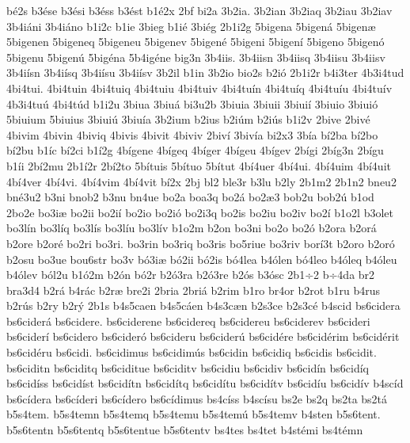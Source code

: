 {b^^e92s
b3^^e9se
b3^^e9si
b3^^e9ss
b3^^e9st
b1^^e92x
2bf
bi2a
3b2ia.
3b2ian
3b2iaq
3b2iau
3b2iav
3b4i^^e1ni
3b4i^^e1no
b1i2c
b1ie
3bieg
b1i^^e9
3bi^^e9g
2b1i2g
5bigena
5bigen^^e1
5bigen^^e6
5bigenen
5bigeneq
5bigeneu
5bigenev
5bigen^^e9
5bigeni
5bigen^^ed
5bigeno
5bigen^^f3
5bigenu
5bigen^^fa
5big^^e9na
5b4ig^^e9ne
big3n
3b4iis.
3b4iisn
3b4iisq
3b4iisu
3b4iisv
3b4i^^edsn
3b4i^^edsq
3b4i^^edsu
3b4i^^edsv
3b2il
b1in
3b2io
bio2s
b2i^^f3
2b1i2r
b4i3ter
4b3i4tud
4bi4tui.
4bi4tuin
4bi4tuiq
4bi4tuiu
4bi4tuiv
4bi4tu^^edn
4bi4tu^^edq
4bi4tu^^edu
4bi4tu^^edv
4b3i4tu^^fa
4bi4t^^fad
b1i2u
3biua
3biu^^e1
bi3u2b
3biuia
3biuii
3biui^^ed
3biuio
3biui^^f3
5biuium
5biuius
3biui^^fa
3biu^^eda
3b2ium
b2ius
b2i^^fam
b2i^^fas
b1i2v
2bive
2biv^^e9
4bivim
4bivin
4biviq
4bivis
4bivit
4biviv
2biv^^ed
3biv^^eda
bi2x3
3b^^eda
b^^ed2ba
b^^ed2bo
b^^ed2bu
b1^^edc
b^^ed2ci
b1^^ed2g
4b^^edgene
4b^^edgeq
4b^^edger
4b^^edgeu
4b^^edgev
2b^^edgi
2b^^edg3n
2b^^edgu
b1^^edi
2b^^ed2mu
2b1^^ed2r
2b^^ed2to
5b^^edtuis
5b^^edtuo
5b^^edtut
4b^^ed4uer
4b^^ed4ui.
4b^^ed4uim
4b^^ed4uit
4b^^ed4ver
4b^^ed4vi.
4b^^ed4vim
4b^^ed4vit
b^^ed2x
2bj
bl2
ble3r
b3lu
b2ly
2b1m2
2b1n2
bneu2
bn^^e93u2
b3ni
bnob2
b3nu
bn4ue
bo2a
boa3q
bo2^^e1
bo2^^e63
bob2u
bob2^^fa
b1od
2bo2e
bo3i^^e6
bo2ii
bo2i^^ed
bo2io
bo2i^^f3
bo2i3q
bo2is
bo2iu
bo2iv
bo2^^ed
b1o2l
b3olet
bo3l^^edn
bo3l^^edq
bo3l^^eds
bo3l^^edu
bo3l^^edv
b1o2m
b2on
bo3ni
bo2o
bo2^^f3
b2ora
b2or^^e1
b2ore
b2or^^e9
bo2ri
bo3ri.
bo3rin
bo3riq
bo3ris
bo5riue
bo3riv
bor^^ed3t
b2oro
b2or^^f3
b2osu
bo3ue
bou6str
bo3v
b^^f33i^^e6
b^^f32ii
b^^f32is
b^^f34lea
b4^^f3len
b^^f34leo
b4^^f3leq
b4^^f3leu
b4^^f3lev
b^^f3l2u
b1^^f32m
b2^^f3n
b^^f32r
b2^^f33ra
b2^^f33re
b2^^f3s
b3^^f3sc
2b1^^f72
b^^f74da
br2
bra3d4
b2r^^e1
b4r^^e1c
b2r^^e6
bre2i
2bria
2bri^^e1
b2rim
b1ro
br4or
b2rot
b1ru
b4rus
b2r^^fas
b2ry
b2r^^fd
2b1s
b4s5caen
b4s5c^^e1en
b4s3c^^e6n
b2s3ce
b2s3c^^e9
b4scid
bs6cidera
bs6cider^^e1
bs6cidere.
bs6ciderene
bs6cidereq
bs6cidereu
bs6ciderev
bs6cideri
bs6cider^^ed
bs6cidero
bs6cider^^f3
bs6cideru
bs6cider^^fa
bs6cid^^e9re
bs6cid^^e9rim
bs6cid^^e9rit
bs6cid^^e9ru
bs6cidi.
bs6cidimus
bs6cidim^^fas
bs6cidin
bs6cidiq
bs6cidis
bs6cidit.
bs6ciditn
bs6ciditq
bs6ciditue
bs6ciditv
bs6cidiu
bs6cidiv
bs6cid^^edn
bs6cid^^edq
bs6cid^^edss
bs6cid^^edst
bs6cid^^edtn
bs6cid^^edtq
bs6cid^^edtu
bs6cid^^edtv
bs6cid^^edu
bs6cid^^edv
b4sc^^edd
bs6c^^eddera
bs6c^^edderi
bs6c^^eddero
bs6c^^eddimus
bs4c^^edss
b4sc^^edsu
bs2e
bs2q
bs2ta
bs2t^^e1
b5s4tem.
b5s4temn
b5s4temq
b5s4temu
b5s4tem^^fa
b5s4temv
b4sten
b5s6tent.
b5s6tentn
b5s6tentq
b5s6tentue
b5s6tentv
bs4tes
bs4tet
b4st^^e9mi
bs4t^^e9mn
}
